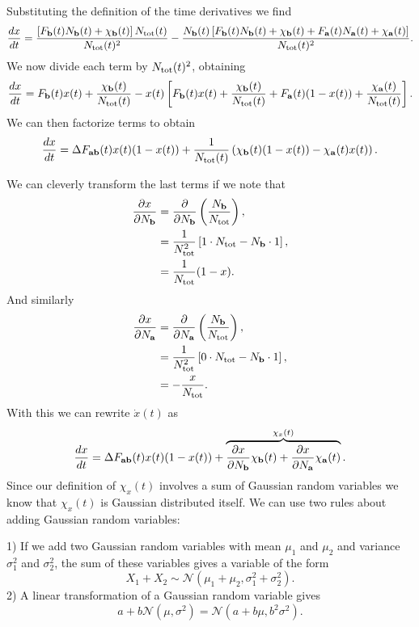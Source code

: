 Substituting the definition of the time derivatives we find
\begin{equation}
  {d{x} \over dt} = {\left[ F_{\mathbf{b}}(t) N_{\mathbf{b}}(t) + \chi_{\mathbf{b}}(t)  \right] N_{\text{tot}}(t)
  \over N_{\text{tot}}(t)^2} -
  {N_{\mathbf{b}}(t)
  \left[ F_{\mathbf{b}}(t) N_{\mathbf{b}}(t) + \chi_{\mathbf{b}}(t) +
         F_{\mathbf{a}}(t) N_{\mathbf{a}}(t) + \chi_{\mathbf{a}}(t)\right] \over N_{\text{tot}}(t)^2}.
\end{equation}
We now divide each term by $N_{\text{tot}}(t)^2$, obtaining
\begin{equation}
  {d{x} \over dt} = F_{\mathbf{b}}(t)x(t) + {\chi_{\mathbf{b}}(t) \over N_{\text{tot}}(t)} -
  x(t) \left[ F_{\mathbf{b}}(t)x(t) + {\chi_{\mathbf{b}}(t) \over N_{\text{tot}}(t)} +
              F_{\mathbf{a}}(t)(1 - x(t)) + {\chi_{\mathbf{a}}(t) \over N_{\text{tot}}(t)} \right].
\end{equation}
We can then factorize terms to obtain
\begin{equation}
  {d{x} \over dt} = \Delta F_{\mathbf{ab}}(t) x(t) (1 - x(t)) + {1 \over N_{\text{tot}}(t)}
  \left( \chi_{\mathbf{b}}(t)(1 - x(t)) - \chi_{\mathbf{a}}(t) x(t) \right).
\end{equation}

We can cleverly transform the last terms if we note that
\begin{align}
  {\partial x \over \partial N_{\mathbf{b}}} &= {\partial \over \partial N_{\mathbf{b}}}
  \left( {N_{\mathbf{b}} \over N_{\text{tot}}} \right), \\
  &= {1 \over N_{\text{tot}}^2} \left[ 1 \cdot N_{\text{tot}} - N_{\mathbf{b}} \cdot 1 \right],\\
  &= {1 \over N_{\text{tot}}}(1 - x).
\end{align}
And similarly
\begin{align}
  {\partial x \over \partial N_{\mathbf{a}}} &= {\partial \over \partial N_{\mathbf{a}}}
  \left( {N_{\mathbf{b}} \over N_{\text{tot}}} \right), \\
  &= {1 \over N_{\text{tot}}^2} \left[ 0 \cdot N_{\text{tot}} - N_{\mathbf{b}} \cdot 1 \right],\\
  &= - {x \over N_{\text{tot}}}.
\end{align}
With this we can rewrite $\dot{x}(t)$ as
\begin{equation}
  {d{x} \over dt} = \Delta F_{\mathbf{ab}}(t) x(t) (1 - x(t)) + \overbrace{
  {\partial x \over \partial N_{\mathbf{b}}} \chi_{\mathbf{b}}(t) +
  {\partial x \over \partial N_{\mathbf{a}}} \chi_{\mathbf{a}}(t)
  }^{\chi_x(t)}.
\end{equation}
Since our definition of $\chi_x(t)$ involves a sum of Gaussian random variables
we know that $\chi_x(t)$ is Gaussian distributed itself. We can use two rules
about adding Gaussian random variables:

1) If we add two Gaussian random variables with mean $\mu_1$ and $\mu_2$ and
variance $\sigma_1^2$ and $\sigma_2^2$, the sum of these variables gives a
variable of the form
\begin{equation}
  X_1 + X_2 \sim \mathcal{N}\left( \mu_1 + \mu_2,
                                   \sigma_1^2 + \sigma_2^2 \right).
\end{equation}
2) A linear transformation of a Gaussian random variable gives
\begin{equation}
  a + b \mathcal{N} \left( \mu, \sigma^2 \right) =
  \mathcal{N}(a + b \mu, b^2 \sigma^2).
\end{equation}


